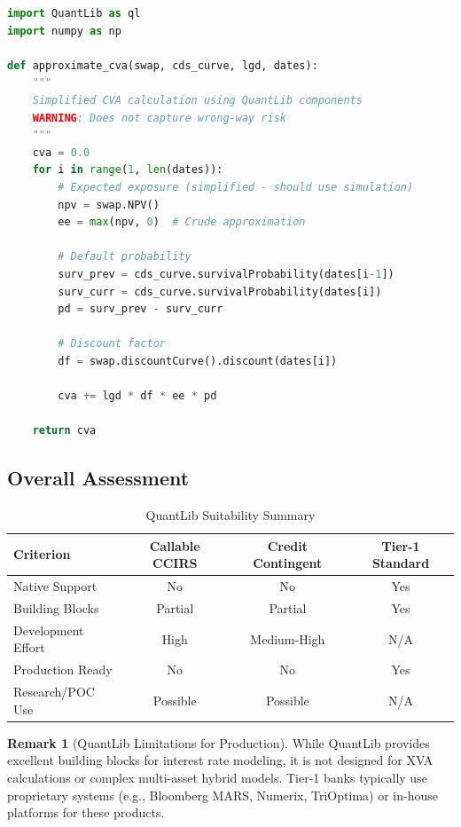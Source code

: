 \documentclass[11pt,a4paper]{article}
\theoremstyle{definition}
\newtheorem{remark}{Remark}[section]
\begin{document}
\begin{lstlisting}[language=Python, caption=CVA Approximation with QuantLib]
import QuantLib as ql
import numpy as np

def approximate_cva(swap, cds_curve, lgd, dates):
    """
    Simplified CVA calculation using QuantLib components
    WARNING: Does not capture wrong-way risk
    """
    cva = 0.0
    for i in range(1, len(dates)):
        # Expected exposure (simplified - should use simulation)
        npv = swap.NPV()
        ee = max(npv, 0)  # Crude approximation

        # Default probability
        surv_prev = cds_curve.survivalProbability(dates[i-1])
        surv_curr = cds_curve.survivalProbability(dates[i])
        pd = surv_prev - surv_curr

        # Discount factor
        df = swap.discountCurve().discount(dates[i])

        cva += lgd * df * ee * pd

    return cva
\end{lstlisting}

\subsection{Overall Assessment}

\begin{table}[h]
\centering
\caption{QuantLib Suitability Summary}
\label{tab:ql_summary}
\begin{tabular}{lccc}
\toprule
\textbf{Criterion} & \textbf{Callable CCIRS} & \textbf{Credit Contingent} & \textbf{Tier-1 Standard} \\
\midrule
Native Support & No & No & Yes \\
Building Blocks & Partial & Partial & Yes \\
Development Effort & High & Medium-High & N/A \\
Production Ready & No & No & Yes \\
Research/POC Use & Possible & Possible & N/A \\
\bottomrule
\end{tabular}
\end{table}

\begin{remark}[QuantLib Limitations for Production]
While QuantLib provides excellent building blocks for interest rate modeling, it is not designed for XVA calculations or complex multi-asset hybrid models. Tier-1 banks typically use proprietary systems (e.g., Bloomberg MARS, Numerix, TriOptima) or in-house platforms for these products.
\end{remark}
\end{document}
